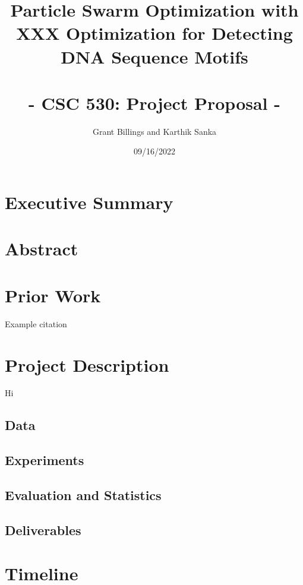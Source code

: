 \documentclass{article}
\title{%
	\Large Particle Swarm Optimization with XXX Optimization for Detecting DNA Sequence Motifs \\
	\large \; \\ - CSC 530: Project Proposal -}
\author{Grant Billings and Karthik Sanka}
\date{09/16/2022}
\begin{document}
\maketitle
\section{Executive Summary}
\section{Abstract}
\section{Prior Work}
Example citation \cite{fister2013brief}
\section{Project Description}
Hi
\subsection{Data}
\subsection{Experiments}
\subsection{Evaluation and Statistics}
\subsection{Deliverables}
\section{Timeline}
\printbibliography
\end{document}
